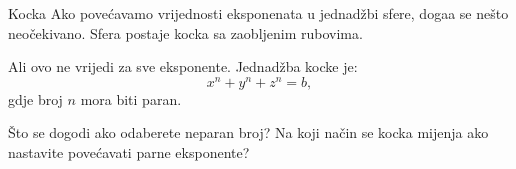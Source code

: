 \begin{surferPage}[Cube]{Kocka}
Ako pove\' cavamo vrijednosti eksponenata u jednad\v zbi sfere, doga\dj a se ne\v sto neo\v cekivano. Sfera postaje kocka sa zaobljenim rubovima.

\vspace{0.3cm}
Ali ovo ne vrijedi za sve eksponente. Jednad\v zba kocke je:
\[x^n+y^n+z^n=b,\]
gdje broj $n$ mora biti paran.

\vspace{0.3cm}
\v Sto se dogodi ako odaberete neparan broj? Na koji na\v cin se kocka mijenja ako nastavite pove\' cavati parne eksponente?
\end{surferPage}
